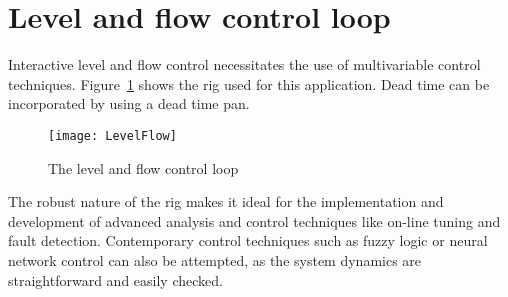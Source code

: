 \section{Level and flow control loop}

Interactive level and flow control necessitates the use of multivariable control techniques.  Figure~\ref{fig:rig:levelflow} shows the rig used for this application.  Dead time can be incorporated by using a dead time pan. 
\begin{figure}
	\centering
	\texttt{[image: LevelFlow]}
	\caption{The level and flow control loop}
	\label{fig:rig:levelflow}
\end{figure}
The robust nature of the rig makes it ideal for the implementation and development of advanced analysis and control techniques like on-line tuning and fault detection.  Contemporary control techniques such as fuzzy logic or neural network control can also be attempted, as the system dynamics are straightforward and easily checked.





